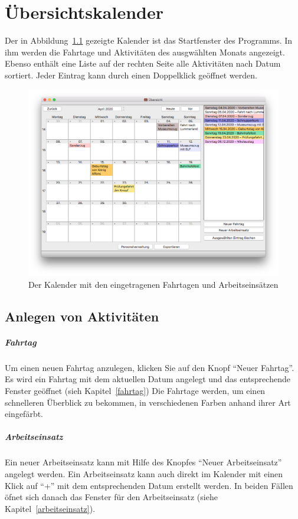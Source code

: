 \chapter{Übersichtskalender}\label{kalender}
Der in Abbildung~\ref{fig:kalender} gezeigte Kalender ist das Startfenster des Programms.
In ihm werden die Fahrtage und Aktivitäten des ausgwählten Monats angezeigt.
Ebenso enthält eine Liste auf der rechten Seite alle Aktivitäten nach Datum sortiert.
Jeder Eintrag kann durch einen Doppelklick geöffnet werden.

\begin{figure}[h!]
  \includegraphics[width=\textwidth]{img/kalender}
  \caption{Der Kalender mit den eingetragenen Fahrtagen und Arbeitseinsätzen}
  \label{fig:kalender}
\end{figure}



\section{Anlegen von Aktivitäten}\label{kalender:anlegen}
\paragraph{Fahrtag}
Um einen neuen Fahrtag anzulegen, klicken Sie auf den Knopf "`Neuer Fahrtag"'.
Es wird ein Fahrtag mit dem aktuellen Datum angelegt und das entsprechende Fenster geöffnet (sieh Kapitel~\ref{fahrtag})
Die Fahrtage werden, um einen schnelleren Überblick zu bekommen, in verschiedenen Farben anhand ihrer Art eingefärbt.

\paragraph{Arbeitseinsatz}
Ein neuer Arbeitseinsatz kann mit Hilfe des Knopfes "`Neuer Arbeitseinsatz"' angelegt werden.
Ein Arbeitseinsatz kann auch direkt im Kalender mit einen Klick auf ``+'' mit dem entsprechenden Datum erstellt werden.
In beiden Fällen öfnet sich danach das Fenster für den Arbeitseinsatz (siehe Kapitel~\ref{arbeitseinsatz}).




